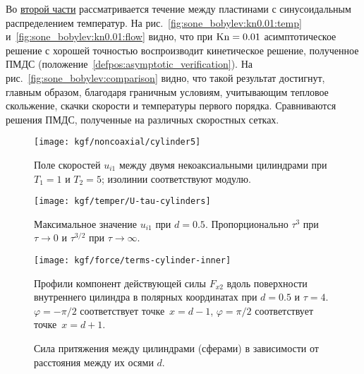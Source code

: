 Во \underline{второй части} рассматривается течение между пластинами с синусоидальным распределением температур.
На рис.~\ref{fig:sone_bobylev:kn0.01:temp} и~\ref{fig:sone_bobylev:kn0.01:flow} видно,
что при \(\mathrm{Kn}=0.01\) асимптотическое решение с хорошей точностью воспроизводит кинетическое решение,
полученное ПМДС (положение~\ref{defpos:asymptotic_verification}).
На рис.~\ref{fig:sone_bobylev:comparison} видно, что такой результат достигнут, главным образом,
благодаря граничным условиям, учитывающим тепловое скольжение, скачки скорости и температуры первого порядка.
Сравниваются решения ПМДС, полученные на различных скоростных сетках.


\begin{figure}
    \centering
    \texttt{[image: kgf/noncoaxial/cylinder5]}
    \caption{Поле скоростей \(u_{i1}\) между двумя некоаксиальными цилиндрами при \(T_1=1\) и \(T_2=5\);
        изолинии соответствуют модулю.}
    \label{fig:cylinders:velocity}
\end{figure}

\begin{figure}
    \centering
    \begin{minipage}{.48\textwidth}
        \texttt{[image: kgf/temper/U-tau-cylinders]}
        \caption{Максимальное значение \(u_{i1}\) при \(d=0.5\).
            Пропорционально \(\tau^3\) при \(\tau\to0\) и \(\tau^{3/2}\) при \(\tau\to\infty\).}
        \label{fig:cylinders:maxU}
    \end{minipage}
    \hfill
    \begin{minipage}{.48\textwidth}
        \texttt{[image: kgf/force/terms-cylinder-inner]}
        \caption{Профили компонент действующей силы \(F_{x2}\) вдоль поверхности внутреннего цилиндра
            в полярных координатах при \(d=0.5\) и \(\tau=4\).
            \(\varphi = -\pi/2\) соответствует точке~\(x=d-1\), \(\varphi = \pi/2\) соответствует точке~\(x=d+1\).}
        \label{fig:cylinders:terms_inner}
    \end{minipage}
\end{figure}

\begin{figure}
    \centering
    \caption{Сила притяжения между цилиндрами (сферами) в зависимости от расстояния между их осями \(d\).}
    \label{fig:cylinders:force}
\end{figure}

